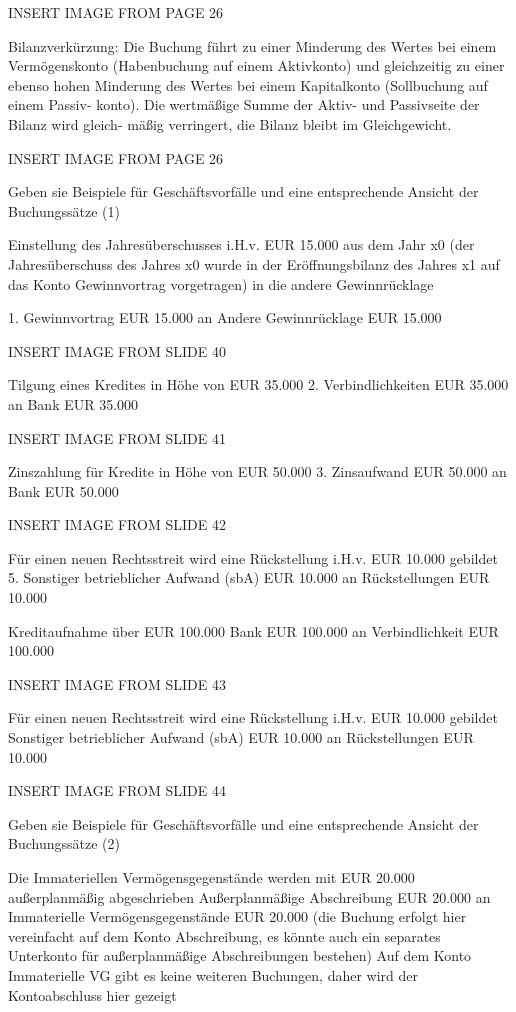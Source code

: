 INSERT IMAGE FROM PAGE 26 

Bilanzverkürzung:
Die Buchung führt zu einer Minderung des Wertes bei einem Vermögenskonto
(Habenbuchung auf einem Aktivkonto) und gleichzeitig zu einer ebenso hohen
Minderung des Wertes bei einem Kapitalkonto (Sollbuchung auf einem Passiv-
konto). Die wertmäßige Summe der Aktiv- und Passivseite der Bilanz wird gleich-
mäßig verringert, die Bilanz bleibt im Gleichgewicht.


INSERT IMAGE FROM PAGE 26 


Geben sie Beispiele für Geschäftsvorfälle und eine entsprechende Ansicht der Buchungssätze (1)

Einstellung des Jahresüberschusses i.H.v. EUR 15.000 aus dem Jahr x0 
(der Jahresüberschuss des Jahres x0 wurde in der Eröffnungsbilanz des Jahres x1 auf das Konto
Gewinnvortrag vorgetragen) in die andere Gewinnrücklage

1. Gewinnvortrag EUR 15.000 an Andere Gewinnrücklage EUR 15.000

INSERT IMAGE FROM SLIDE 40


Tilgung eines Kredites in Höhe von EUR 35.000
    2. Verbindlichkeiten EUR 35.000 an Bank EUR 35.000

INSERT IMAGE FROM SLIDE 41


Zinszahlung für Kredite in Höhe von EUR 50.000
3. Zinsaufwand EUR 50.000 an Bank EUR 50.000

INSERT IMAGE FROM SLIDE 42

Für einen neuen Rechtsstreit wird eine Rückstellung i.H.v. EUR 10.000 gebildet
5. Sonstiger betrieblicher Aufwand (sbA) EUR 10.000 an Rückstellungen EUR 10.000


Kreditaufnahme über EUR 100.000
Bank EUR 100.000 an Verbindlichkeit EUR 100.000


INSERT IMAGE FROM SLIDE 43


Für einen neuen Rechtsstreit wird eine Rückstellung i.H.v. EUR 10.000 gebildet
Sonstiger betrieblicher Aufwand (sbA) EUR 10.000 an Rückstellungen EUR 10.000

INSERT IMAGE FROM SLIDE 44




Geben sie Beispiele für Geschäftsvorfälle und eine entsprechende Ansicht der Buchungssätze (2)

Die Immateriellen Vermögensgegenstände werden mit EUR 20.000 außerplanmäßig abgeschrieben
Außerplanmäßige Abschreibung EUR 20.000 an Immaterielle Vermögensgegenstände EUR 20.000 
(die Buchung erfolgt hier vereinfacht auf dem Konto Abschreibung, es könnte auch
ein separates Unterkonto für außerplanmäßige Abschreibungen bestehen)
Auf dem Konto Immaterielle VG gibt es keine weiteren Buchungen, daher wird der Kontoabschluss hier gezeigt


